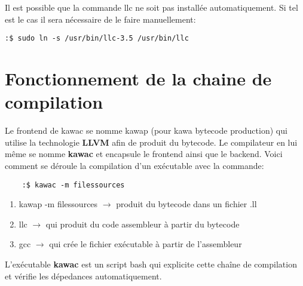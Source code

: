 \documentclass{../res/univ-projet}
\begin{document}
		Il est possible que la commande llc ne soit pas installée automatiquement. Si tel est le cas il sera nécessaire de le faire manuellement:\\
                \begin{verbatim}
:$ sudo ln -s /usr/bin/llc-3.5 /usr/bin/llc
\end{verbatim}


 \section{Fonctionnement de la chaine de compilation}
  Le frontend de kawac se nomme kawap (pour kawa bytecode production) qui utilise la technologie \textbf{LLVM} afin de produit du bytecode. Le compilateur en lui même se nomme \textbf{kawac} et encapsule le frontend ainsi que le backend. Voici comment se déroule la compilation d'un exécutable avec la commande:\\
  \begin{verbatim}
    :$ kawac -m filessources
  \end{verbatim}

  \begin{enumerate}
    \item kawap -m filessources $\rightarrow$ produit du bytecode dans un fichier .ll
    \item llc $\rightarrow$ qui produit du code assembleur à partir du bytecode
    \item gcc $\rightarrow$ qui crée le fichier exécutable à partir de l'assembleur
  \end{enumerate}

  L'exécutable \textbf{kawac} est un script bash qui explicite cette chaîne de compilation et vérifie les dépedances automatiquement.
\end{document}
